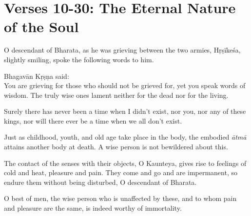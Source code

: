 \newpage
\section{Verses 10-30: The Eternal Nature of the Soul}\label{sec-verses-10-30-the-eternal-nature-of-the-soul}

{O descendant of Bharata, as he was grieving between the two armies, Hṛṣīkeśa, slightly smiling, spoke the following words to him.}

{\hspace*{1em}Bhagavān Kṛṣṇa said: \\
You are grieving for those who should not be grieved for, yet you speak words of wisdom. The truly wise ones lament neither for the dead nor for the living.}

{Surely there has never been a time when I didn't exist, nor you, nor any of these kings, nor will there ever be a time when we all don't exist.}

{Just as childhood, youth, and old age take place in the body, the embodied \textit{ātmā} attains another body at death. A wise person is not bewildered about this.}

{The contact of the senses with their objects, O Kaunteya, gives rise to feelings of cold and heat, pleasure and pain. They come and go and are impermanent, so endure them without being disturbed, O descendant of Bharata.}

{O best of men, the wise person who is unaffected by these, and to whom pain and pleasure are the same, is indeed worthy of immortality.}

